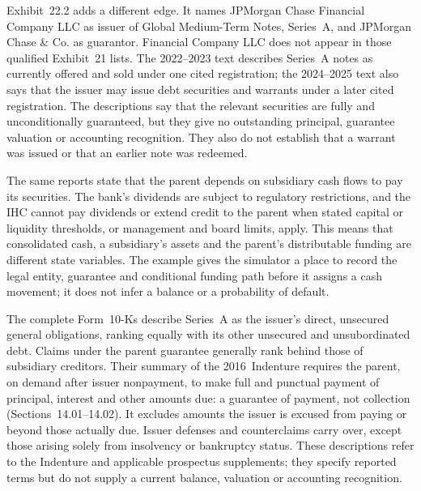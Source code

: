 Exhibit~22.2 adds a different edge. It names JPMorgan Chase Financial Company
LLC as issuer of Global Medium-Term Notes, Series~A, and JPMorgan Chase \& Co.
as guarantor. Financial Company LLC does not appear in those qualified
Exhibit~21 lists. The 2022--2023 text describes Series~A notes as currently
offered and sold under one cited registration; the 2024--2025 text also says
that the issuer may issue debt securities and warrants under a later cited
registration. The descriptions say that the relevant securities are fully and
unconditionally guaranteed, but they give no outstanding principal, guarantee
valuation or accounting recognition. They also do not establish that a warrant
was issued or that an earlier note was redeemed.

The same reports state that the parent depends on subsidiary cash flows to pay
its securities. The bank's dividends are subject to regulatory restrictions,
and the IHC cannot pay dividends or extend credit to the parent when stated
capital or liquidity thresholds, or management and board limits, apply. This
means that consolidated cash, a subsidiary's assets and the parent's
distributable funding are different state variables. The example gives the
simulator a place to record the legal entity, guarantee and conditional funding
path before it assigns a cash movement; it does not infer a balance or a
probability of default.

The complete Form~10-Ks describe Series~A as the issuer's direct, unsecured
general obligations, ranking equally with its other unsecured and
unsubordinated debt. Claims under the parent guarantee generally rank behind
those of subsidiary creditors. Their summary of the 2016~Indenture requires
the parent, on demand after issuer nonpayment, to make full and punctual
payment of principal, interest and other amounts due: a guarantee of payment,
not collection
(Sections~14.01--14.02). It excludes amounts the issuer is excused from paying
or beyond those actually due. Issuer defenses and counterclaims carry over,
except those arising solely from insolvency or bankruptcy status. These
descriptions refer to the Indenture and applicable prospectus supplements;
they specify reported terms but do not supply a current balance, valuation or
accounting recognition.

